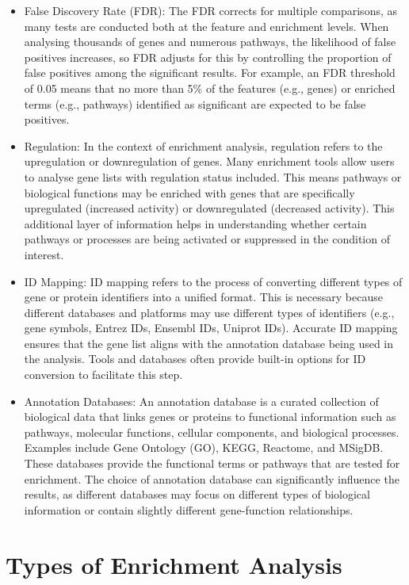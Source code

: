 \documentclass[
]{book}
\begin{document}
\begin{itemize}
\item
  {False Discovery Rate (FDR):}
  The FDR corrects for multiple comparisons, as many tests are conducted both at the feature and enrichment levels. When analysing thousands of genes and numerous pathways, the likelihood of false positives increases, so FDR adjusts for this by controlling the proportion of false positives among the significant results. For example, an FDR threshold of 0.05 means that no more than 5\% of the features (e.g., genes) or enriched terms (e.g., pathways) identified as significant are expected to be false positives.
\item
  {Regulation:}
  In the context of enrichment analysis, regulation refers to the upregulation or downregulation of genes. Many enrichment tools allow users to analyse gene lists with regulation status included. This means pathways or biological functions may be enriched with genes that are specifically upregulated (increased activity) or downregulated (decreased activity). This additional layer of information helps in understanding whether certain pathways or processes are being activated or suppressed in the condition of interest.
\item
  {ID Mapping:}
  ID mapping refers to the process of converting different types of gene or protein identifiers into a unified format. This is necessary because different databases and platforms may use different types of identifiers (e.g., gene symbols, Entrez IDs, Ensembl IDs, Uniprot IDs). Accurate ID mapping ensures that the gene list aligns with the annotation database being used in the analysis. Tools and databases often provide built-in options for ID conversion to facilitate this step.
\item
  {Annotation Databases:}
  An annotation database is a curated collection of biological data that links genes or proteins to functional information such as pathways, molecular functions, cellular components, and biological processes. Examples include Gene Ontology (GO), KEGG, Reactome, and MSigDB. These databases provide the functional terms or pathways that are tested for enrichment. The choice of annotation database can significantly influence the results, as different databases may focus on different types of biological information or contain slightly different gene-function relationships.
\end{itemize}

\hypertarget{types-of-enrichment-analysis}{%
\section{Types of Enrichment Analysis}\label{types-of-enrichment-analysis}}
\end{document}
